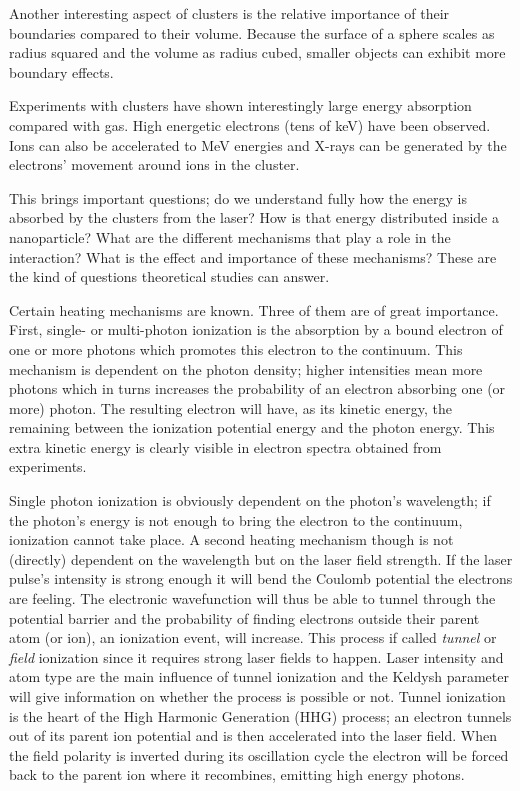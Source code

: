 Another interesting aspect of clusters is the relative importance of
their boundaries compared to their volume. Because the surface of a sphere
scales as radius squared and the volume as radius cubed, smaller objects can
exhibit more boundary effects.

Experiments with clusters have shown interestingly large energy absorption
compared with gas. High energetic electrons (tens of keV) have been observed.
Ions can also be accelerated to MeV energies and X-rays can be generated by the
electrons' movement around ions in the cluster\cite{Ramunno2008}.

This brings important questions; do we understand fully how the energy is
absorbed by the clusters from the laser? How is that energy distributed
inside a nanoparticle? What are the different mechanisms that play a role in
the interaction? What is the effect and importance of these mechanisms? These
are the kind of questions theoretical studies can answer.

Certain heating mechanisms are known. Three of them are of great importance.
First, single- or multi-photon ionization is the absorption by a bound electron
of one or more photons which promotes this electron to the continuum. This
mechanism is dependent on the photon density; higher intensities mean more
photons which in turns increases the probability of an electron absorbing one
(or more) photon. The resulting electron will have, as its kinetic energy, the
remaining between the ionization potential energy and the photon energy. This
extra kinetic energy is clearly visible in electron spectra obtained from
experiments.

Single photon ionization is obviously dependent on the photon's wavelength; if
the photon's energy is not enough to bring the electron to the continuum,
ionization cannot take place. A second heating mechanism though is not
(directly) dependent on the wavelength but on the laser field strength. If the
laser pulse's intensity is strong enough it will bend the Coulomb potential the
electrons are feeling. The electronic wavefunction will thus be able to tunnel
through the potential barrier and the probability of finding electrons
outside their parent atom (or ion), an ionization event, will increase. This
process if called \textit{tunnel} or \textit{field} ionization  since it
requires strong laser fields to happen. Laser intensity and atom type are the
main influence of tunnel ionization and the Keldysh parameter will give
information on whether the process is possible or not. Tunnel ionization is the
heart of the High Harmonic Generation (HHG) process; an electron tunnels out of
its parent ion potential and is then accelerated into the laser field. When the
field polarity is inverted during its oscillation cycle the electron will be
forced back to the parent ion where it recombines, emitting high energy photons.

